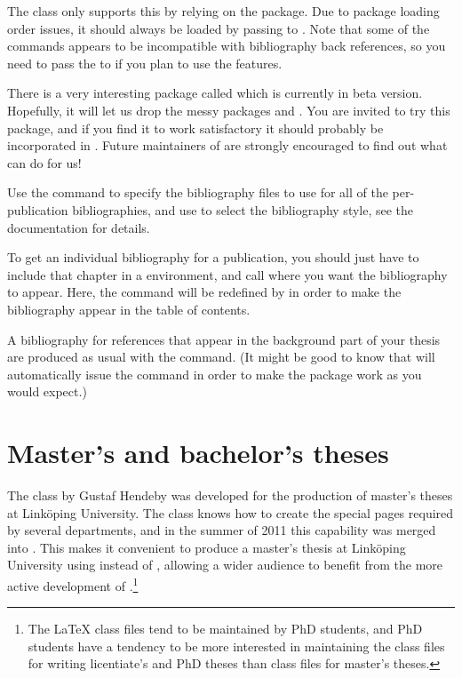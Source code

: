 The \rtthesis class only supports this by relying on the  package.  Due to package loading order issues, it should always be loaded by passing  to \rtthesis.  Note that some of the  commands appears to be incompatible with bibliography back references, so you need to pass the  to \rtthesis if you plan to use the  features.

\begin{remark}
  There is a very interesting package called  which is currently in beta version.  Hopefully, it will let us drop the messy packages  and .  You are invited to try this package, and if you find it to work satisfactory it should probably be incorporated in \rtthesis.  Future maintainers of \rtthesis are strongly encouraged to find out what  can do for us!
\end{remark}

Use the command  to specify the bibliography files to use for all of the per-publication bibliographies, and use  to select the bibliography style, see the  documentation for details.

To get an individual bibliography for a publication, you should just have to include that chapter in a  environment, and call  where you want the bibliography to appear.  Here, the  command will be redefined by \rtthesis in order to make the bibliography appear in the table of contents.

A bibliography for references that appear in the background part of your thesis are produced as usual with the  command.  (It might be good to know that \rtthesis will automatically issue the  command in order to make the  package work as you would expect.)

\section{Master's and bachelor's theses}\label{sec:msc}
%
The  class by Gustaf Hendeby was developed for the production of master's theses at Linköping University.  The class knows how to create the special pages required by several departments, and in the summer of 2011 this capability was merged into \rtthesis.  This makes it convenient to produce a master's thesis at Linköping University using \rtthesis instead of , allowing a wider audience to benefit from the more active development of \rtthesis.\footnote{The \LaTeX{} class files tend to be maintained by PhD students, and PhD students have a tendency to be more interested in maintaining the class files for writing licentiate's and PhD theses than class files for master's theses.}

